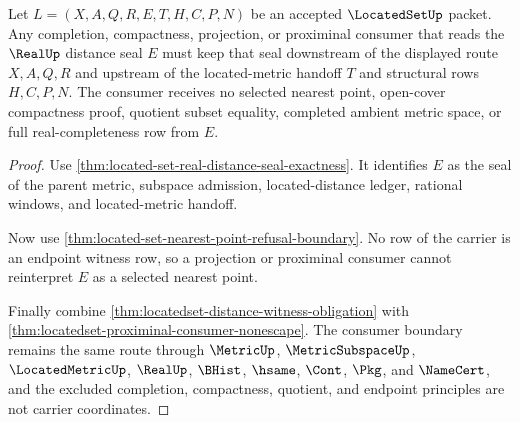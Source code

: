 \begin{theorem}
\label{thm:located-set-real-seal-consumer-boundary}
Let $L=(X,A,Q,R,E,T,H,C,P,N)$ be an accepted $\LocatedSetUp$ packet. Any completion, compactness, projection, or proximinal consumer that reads the $\RealUp$ distance seal $E$ must keep that seal downstream of the displayed route $X,A,Q,R$ and upstream of the located-metric handoff $T$ and structural rows $H,C,P,N$. The consumer receives no selected nearest point, open-cover compactness proof, quotient subset equality, completed ambient metric space, or full real-completeness row from $E$.
\end{theorem}
\begin{proof}
Use \autoref{thm:located-set-real-distance-seal-exactness}. It identifies $E$ as the seal of the parent metric, subspace admission, located-distance ledger, rational windows, and located-metric handoff.

Now use \autoref{thm:located-set-nearest-point-refusal-boundary}. No row of the carrier is an endpoint witness row, so a projection or proximinal consumer cannot reinterpret $E$ as a selected nearest point.

Finally combine \autoref{thm:locatedset-distance-witness-obligation} with \autoref{thm:locatedset-proximinal-consumer-nonescape}. The consumer boundary remains the same route through $\MetricUp$, $\MetricSubspaceUp$, $\LocatedMetricUp$, $\RealUp$, $\BHist$, $\hsame$, $\Cont$, $\Pkg$, and $\NameCert$, and the excluded completion, compactness, quotient, and endpoint principles are not carrier coordinates.
\end{proof}



